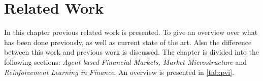 \documentclass{kththesis}
\theoremstyle{definition}
\begin{document}

\chapter{Related Work}\label{ch:3}
In this chapter previous related work is presented. To give an overview over what has been done previously, as well as current state of the art. Also the difference between this work and previous work is discussed. The chapter is divided into the following sections: \textit{Agent based Financial Markets, Market Microstructure} and \textit{Reinforcement Learning in Finance}. An overview is presented in \autoref{tab:pvi}.

\end{document}
